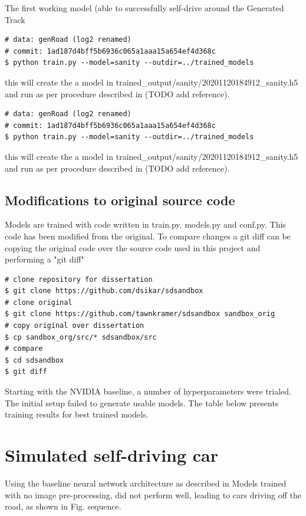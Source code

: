 The first working model (able to successfully self-drive around the Generated Track

\begin{verbatim}
# data: genRoad (log2 renamed)
# commit: 1ad187d4bff5b6936c065a1aaa15a654ef4d368c
$ python train.py --model=sanity --outdir=../trained_models
\end{verbatim}
this will create the a model in trained\_output/sanity/20201120184912\_sanity.h5
and run as per procedure described in (TODO add reference).



\begin{verbatim}
# data: genRoad (log2 renamed)
# commit: 1ad187d4bff5b6936c065a1aaa15a654ef4d368c
$ python train.py --model=sanity --outdir=../trained_models
\end{verbatim}
this will create the a model in trained\_output/sanity/20201120184912\_sanity.h5
and run as per procedure described in (TODO add reference).

\subsection{Modifications to original source code}
Models are trained with code written in train.py, models.py and conf.py. This code has been modified from the original. To compare changes a git diff can be copying the original code over the source code used in this project and performing a "git diff"
\begin{verbatim}
# clone repository for dissertation
$ git clone https://github.com/dsikar/sdsandbox
# clone original
$ git clone https://github.com/tawnkramer/sdsandbox sandbox_orig
# copy original over dissertation
$ cp sandbox_org/src/* sdsandbox/src
# compare
$ cd sdsandbox 
$ git diff
\end{verbatim}


Starting with the NVIDIA baseline, a number of hyperparameters were trialed. The initial setup failed to generate usable models. 
The table below presents training results for best trained models.


\section{Simulated self-driving car}

Using the baseline neural network architecture as described in 
Models trained with no image pre-processing, did not perform well, leading to cars driving off the road, as shown in Fig.  sequence.

